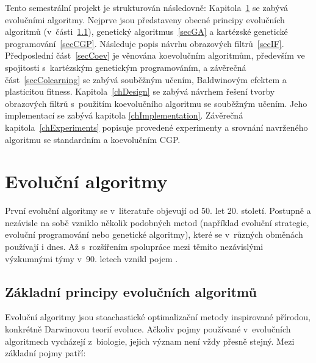 Tento semestrální projekt je strukturován následovně: Kapitola~\ref{chEA} se zabývá evolučními algoritmy. Nejprve jsou představeny obecné principy evolučních algoritmů (v~části~\ref{secEAGeneral}), genetický algoritmus~\ref{secGA} a kartézské genetické programování~\ref{secCGP}. Následuje popis návrhu obrazových filtrů~\ref{secIF}. Předposlední část~\ref{secCoev} je věnována koevolučním algoritmům, především ve spojitosti s~kartézským genetickým programováním, a závěrečná část~\ref{secColearning} se zabývá souběžným učením, Baldwinovým efektem a plasticitou fitness. Kapitola~\ref{chDesign} se zabývá návrhem řešení tvorby obrazových filtrů s~použitím koevolučního algoritmu se souběžným učením. Jeho implementací se zabývá kapitola \ref{chImplementation}. Závěrečná kapitola~\ref{chExperiments} popisuje provedené experimenty a srovnání navrženého algoritmu se standardním a koevolučním CGP.

\chapter{Evoluční algoritmy}
\label{chEA}

První evoluční algoritmy se v~literatuře objevují od 50. let 20. století. Postupně a nezávisle na sobě vzniklo několik podobných metod (například evoluční strategie, evoluční programování nebo genetické algoritmy), které se v~různých obměnách používají i dnes. Až s~rozšířením spolupráce mezi těmito nezávislými výzkumnými týmy v~90. letech vznikl pojem  \cite{Modra}.

\section{Základní principy evolučních algoritmů}
\label{secEAGeneral}

Evoluční algoritmy jsou stoachastické optimalizační metody inspirované přírodou, konkrétně Darwinovou teorií evoluce. Ačkoliv pojmy používané v~evolučních algoritmech vycházejí z~biologie, jejich význam není vždy přesně stejný. Mezi základní pojmy patří:

